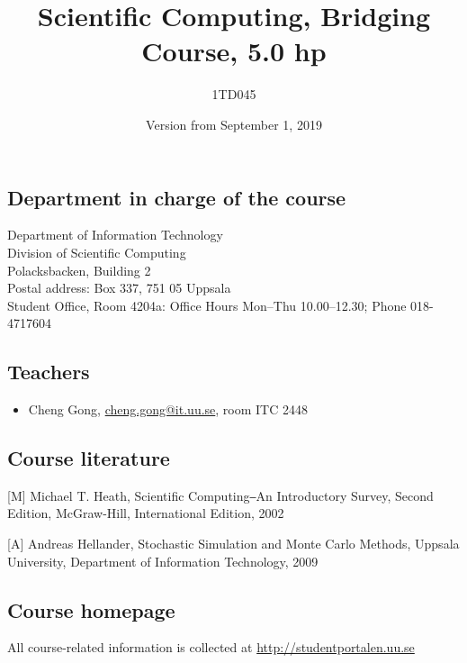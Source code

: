 \documentclass[a4paper,12pt]{article}
\title{Scientific Computing, Bridging Course, 5.0 hp }
\author{1TD045}
\date{\small{Version from September 1, 2019}}
\begin{document}
\maketitle

\setlength{\leftskip}{0em}
\subsection*{Department in charge of the course}
\setlength{\leftskip}{1em} 

Department of Information Technology\\
Division of Scientific Computing\\
Polacksbacken, Building 2\\
Postal address: Box 337, 751 05 Uppsala\\
Student Office, Room 4204a: Office Hours Mon--Thu 10.00--12.30; Phone 018-4717604

\setlength{\leftskip}{0em}
\subsection*{Teachers}
\setlength{\leftskip}{1em}
\begin{itemize}
	\item Cheng Gong, \href{mailto:cheng.gong@it.uu.se}{cheng.gong@it.uu.se}, room ITC 2448
\end{itemize}
\setlength{\leftskip}{0em}
\subsection*{Course literature}
\setlength{\leftskip}{1em}
[M]{\label{M}} Michael T. Heath, Scientific Computing⎯An Introductory Survey, Second Edition, McGraw-Hill, International Edition, 2002

[A] Andreas Hellander, Stochastic Simulation and Monte Carlo Methods, Uppsala University, Department of Information Technology, 2009
 
\setlength{\leftskip}{0em}
\subsection*{Course homepage}
\setlength{\leftskip}{1em}
All course-related information is collected at \url{http://studentportalen.uu.se}%
\end{document}
